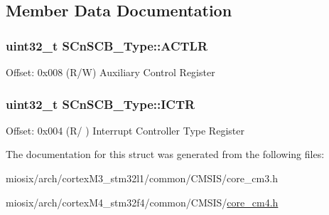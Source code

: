 \subsection{Member Data Documentation}
\hypertarget{struct_s_cn_s_c_b___type_aacadedade30422fed705e8dfc8e6cd8d}{
\subsubsection[{A\-C\-T\-L\-R}]{ uint32\-\_\-t S\-Cn\-S\-C\-B\-\_\-\-Type\-::\-A\-C\-T\-L\-R}}\label{struct_s_cn_s_c_b___type_aacadedade30422fed705e8dfc8e6cd8d}
Offset\-: 0x008 (R/\-W) Auxiliary Control Register \hypertarget{struct_s_cn_s_c_b___type_ad99a25f5d4c163d9005ca607c24f6a98}{
\subsubsection[{I\-C\-T\-R}]{ uint32\-\_\-t S\-Cn\-S\-C\-B\-\_\-\-Type\-::\-I\-C\-T\-R}}\label{struct_s_cn_s_c_b___type_ad99a25f5d4c163d9005ca607c24f6a98}
Offset\-: 0x004 (R/ ) Interrupt Controller Type Register 

The documentation for this struct was generated from the following files\-:\begin{DoxyCompactItemize}
\item 
miosix/arch/cortex\-M3\-\_\-stm32l1/common/\-C\-M\-S\-I\-S/core\-\_\-cm3.\-h\item 
miosix/arch/cortex\-M4\-\_\-stm32f4/common/\-C\-M\-S\-I\-S/\hyperlink{core__cm4_8h}{core\-\_\-cm4.\-h}\end{DoxyCompactItemize}
